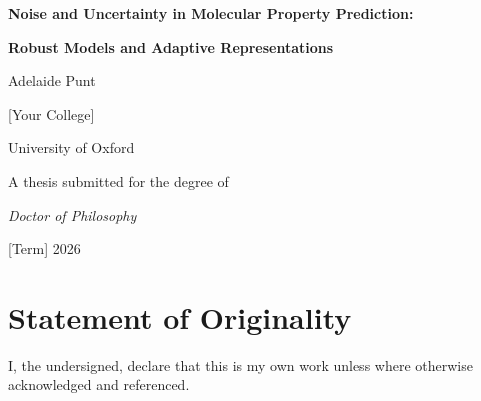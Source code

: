 \documentclass[a4paper,12pt]{report}
\numberwithin{equation}{chapter}
\begin{document}

\begin{titlepage}
\centering
\vspace*{2cm}

{\LARGE \textbf{Noise and Uncertainty in Molecular Property Prediction:}\par}
\vspace{0.4cm}
{\LARGE \textbf{Robust Models and Adaptive Representations}\par}

\vspace{2.5cm}
{\Large Adelaide Punt\par}
\vspace{0.4cm}
{\Large [Your College]\par}
\vspace{0.2cm}
{\Large University of Oxford\par}

\vspace{2.5cm}
{\large A thesis submitted for the degree of\par}
\vspace{0.3cm}
{\Large \textit{Doctor of Philosophy}\par}

\vspace{2cm}
{\large [Term] 2026\par}

\vfill
\end{titlepage}

\chapter*{Statement of Originality}

I, the undersigned, declare that this is my own work unless where otherwise acknowledged and
referenced.
\end{document}
